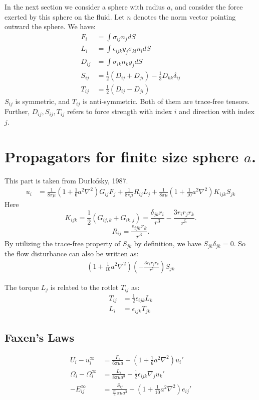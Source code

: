 \documentclass[11pt]{article}
\begin{document}
In the next section we consider a sphere with radius $a$, and consider the force exerted by this sphere on the fluid. Let $n$ denotes the norm vector pointing outward the sphere. We have:
\begin{align}
	F_i &= \int \sigma_{ij} n_j dS \\
	L_i &= \int \epsilon_{ijk} y_j \sigma_{kl} n_l dS \\
	D_{ij} &= \int \sigma_{ik} n_k y_j dS \\
	S_{ij} &= \frac{1}{2}\left(D_{ij}+D_{ji}\right) - \frac{1}{3}D_{kk}\delta_{ij}\\
	T_{ij} &= \frac{1}{2}\left(D_{ij}-D_{ji}\right)
\end{align}
$S_{ij}$ is symmetric, and $T_{ij}$ is anti-symmetric. Both of them are trace-free tensors. Further, $D_{ij},S_{ij},T_{ij}$ refers to force strength with index $i$ and direction with index $j$.

\section{Propagators for finite size sphere $a$.}
This part is taken from Durlofsky, 1987.
\begin{align}
	u_i &= \frac{1}{8\pi\mu} \left(1+\frac{1}{6}a^2\nabla^2 \right) G_{ij}F_j + \frac{1}{8\pi\mu} R_{ij} L_j + \frac{1}{8\pi\mu} \left(1+\frac{1}{10}a^2\nabla^2 \right) K_{ijk}S_{jk}
\end{align}
Here 
$$ K_{ijk} = \frac{1}{2}\left(G_{ij,k}+G_{ik,j}\right) = \frac{\delta_{jk}r_i}{r^3} - \frac{3r_ir_jr_k}{r^5} . $$
$$ R_{ij} =  \frac{\epsilon_{ijk}r_k}{r^3}.$$
By utilizing the trace-free property of $S_{jk}$ by definition, we have $S_{jk}\delta_{jk}=0$. So the flow disturbance can also be written as:
\begin{align}
	\left(1+\frac{1}{10}a^2\nabla^2 \right)\left(- \frac{3r_ir_jr_k}{r^5}\right)S_{jk}
\end{align}



The torque $L_j$ is related to the rotlet $T_{ij}$ as:
\begin{align}
	T_{ij}&=\frac{1}{2}\epsilon_{ijk}L_k\\
	L_i &= \epsilon_{ijk} T_{jk}  
\end{align}

\subsection{Faxen's Laws}
\begin{align}
	U_i - u_i^\infty &= \frac{F_i}{6\pi\mu a} + \left(1+\frac{1}{6}a^2\nabla^2\right)u_i' \\
	\Omega_i - \Omega_i^\infty &= \frac{L_i}{8\pi\mu a^3} + \frac{1}{2}\epsilon_{ijk}\nabla_j u_k' \\
	-E_{ij}^\infty &= \frac{S_{ij}}{\frac{20}{3}\pi\mu a^3} +\left(1+\frac{1}{10}a^2\nabla^2\right) e_{ij}'
\end{align}
\end{document}
